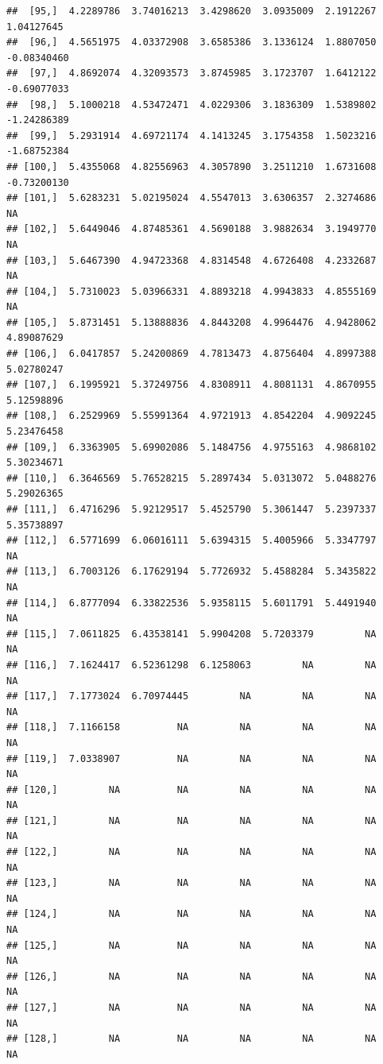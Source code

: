 \documentclass{article}\usepackage[]{graphicx}\usepackage[]{color}
\makeatletter
\newenvironment{kframe}{%
 \def\at@end@of@kframe{}%
 \ifinner\ifhmode%
  \def\at@end@of@kframe{\end{minipage}}%
  \begin{minipage}{\columnwidth}%
 \fi\fi%
 \def\FrameCommand##1{\hskip\@totalleftmargin \hskip-\fboxsep
 \colorbox{shadecolor}{##1}\hskip-\fboxsep
     \hskip-\linewidth \hskip-\@totalleftmargin \hskip\columnwidth}%
 \MakeFramed {\advance\hsize-\width
   \@totalleftmargin\z@ \linewidth\hsize
   \@setminipage}}%
 {\par\unskip\endMakeFramed%
 \at@end@of@kframe}
\newenvironment{knitrout}{}{} %
\makeatother
\begin{document}
\begin{knitrout}
\begin{kframe}
\begin{verbatim}
##  [95,]  4.2289786  3.74016213  3.4298620  3.0935009  2.1912267  1.04127645
##  [96,]  4.5651975  4.03372908  3.6585386  3.1336124  1.8807050 -0.08340460
##  [97,]  4.8692074  4.32093573  3.8745985  3.1723707  1.6412122 -0.69077033
##  [98,]  5.1000218  4.53472471  4.0229306  3.1836309  1.5389802 -1.24286389
##  [99,]  5.2931914  4.69721174  4.1413245  3.1754358  1.5023216 -1.68752384
## [100,]  5.4355068  4.82556963  4.3057890  3.2511210  1.6731608 -0.73200130
## [101,]  5.6283231  5.02195024  4.5547013  3.6306357  2.3274686          NA
## [102,]  5.6449046  4.87485361  4.5690188  3.9882634  3.1949770          NA
## [103,]  5.6467390  4.94723368  4.8314548  4.6726408  4.2332687          NA
## [104,]  5.7310023  5.03966331  4.8893218  4.9943833  4.8555169          NA
## [105,]  5.8731451  5.13888836  4.8443208  4.9964476  4.9428062  4.89087629
## [106,]  6.0417857  5.24200869  4.7813473  4.8756404  4.8997388  5.02780247
## [107,]  6.1995921  5.37249756  4.8308911  4.8081131  4.8670955  5.12598896
## [108,]  6.2529969  5.55991364  4.9721913  4.8542204  4.9092245  5.23476458
## [109,]  6.3363905  5.69902086  5.1484756  4.9755163  4.9868102  5.30234671
## [110,]  6.3646569  5.76528215  5.2897434  5.0313072  5.0488276  5.29026365
## [111,]  6.4716296  5.92129517  5.4525790  5.3061447  5.2397337  5.35738897
## [112,]  6.5771699  6.06016111  5.6394315  5.4005966  5.3347797          NA
## [113,]  6.7003126  6.17629194  5.7726932  5.4588284  5.3435822          NA
## [114,]  6.8777094  6.33822536  5.9358115  5.6011791  5.4491940          NA
## [115,]  7.0611825  6.43538141  5.9904208  5.7203379         NA          NA
## [116,]  7.1624417  6.52361298  6.1258063         NA         NA          NA
## [117,]  7.1773024  6.70974445         NA         NA         NA          NA
## [118,]  7.1166158          NA         NA         NA         NA          NA
## [119,]  7.0338907          NA         NA         NA         NA          NA
## [120,]         NA          NA         NA         NA         NA          NA
## [121,]         NA          NA         NA         NA         NA          NA
## [122,]         NA          NA         NA         NA         NA          NA
## [123,]         NA          NA         NA         NA         NA          NA
## [124,]         NA          NA         NA         NA         NA          NA
## [125,]         NA          NA         NA         NA         NA          NA
## [126,]         NA          NA         NA         NA         NA          NA
## [127,]         NA          NA         NA         NA         NA          NA
## [128,]         NA          NA         NA         NA         NA          NA

\end{verbatim}
\end{kframe}
\end{knitrout}
\end{document}
